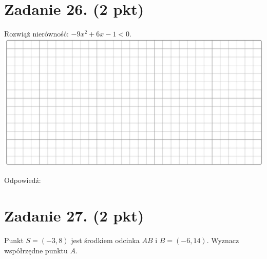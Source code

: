 \documentclass[10pt]{article}
\begin{document}
\section*{Zadanie 26. (2 pkt)}
Rozwiąż nierówność: \(-9 x^{2}+6 x-1<0\).\\
\includegraphics[max width=\textwidth, center]{2024_11_21_fd9e49107d1ddcec5cd8g-08}

Odpowiedź: \(\qquad\)

\section*{Zadanie 27. (2 pkt)}
Punkt \(S=(-3,8)\) jest środkiem odcinka \(A B\) i \(B=(-6,14)\). Wyznacz współrzędne punktu \(A\).
\end{document}

